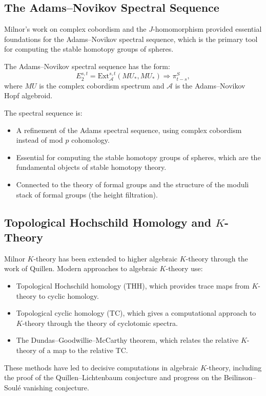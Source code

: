 \subsection{The Adams--Novikov Spectral Sequence}

Milnor's work on complex cobordism and the $J$-homomorphism provided essential foundations for the Adams--Novikov spectral sequence, which is the primary tool for computing the stable homotopy groups of spheres.

The Adams--Novikov spectral sequence has the form:
\[
E_2^{s,t} = \text{Ext}_{\mathcal{A}}^{s,t}(MU_*, MU_*) \Rightarrow \pi_{t-s}^S,
\]
where $MU$ is the complex cobordism spectrum and $\mathcal{A}$ is the Adams--Novikov Hopf algebroid.

The spectral sequence is:
\begin{itemize}
\item A refinement of the Adams spectral sequence, using complex cobordism instead of mod $p$ cohomology.
\item Essential for computing the stable homotopy groups of spheres, which are the fundamental objects of stable homotopy theory.
\item Connected to the theory of formal groups and the structure of the moduli stack of formal groups (the height filtration).
\end{itemize}

\subsection{Topological Hochschild Homology and \texorpdfstring{$K$}{K}-Theory}

Milnor $K$-theory has been extended to higher algebraic $K$-theory through the work of Quillen. Modern approaches to algebraic $K$-theory use:
\begin{itemize}
\item Topological Hochschild homology (THH), which provides trace maps from $K$-theory to cyclic homology.
\item Topological cyclic homology (TC), which gives a computational approach to $K$-theory through the theory of cyclotomic spectra.
\item The Dundas--Goodwillie--McCarthy theorem, which relates the relative $K$-theory of a map to the relative TC.
\end{itemize}

These methods have led to decisive computations in algebraic $K$-theory, including the proof of the Quillen--Lichtenbaum conjecture and progress on the Beilinson--Soulé vanishing conjecture.

